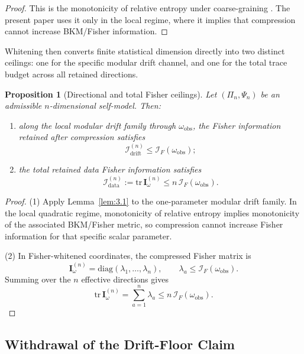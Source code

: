 \documentclass[12pt]{article}
\newtheorem{proposition}[theorem]{Proposition}
\theoremstyle{definition}
\theoremstyle{remark}
\begin{document}
\begin{proof}
This is the monotonicity of relative entropy under coarse-graining
\cite{Petz1986}. The present paper uses it only in the local regime,
where it implies that compression cannot increase BKM/Fisher
information.
\end{proof}

Whitening then converts finite statistical dimension directly into two
distinct ceilings: one for the specific modular drift channel, and one
for the total trace budget across all retained directions.

\begin{proposition}[Directional and total Fisher ceilings]\label{prop:3.2}
Let \((\Pi_n,\Psi_n)\) be an admissible \(n\)-dimensional self-model.
Then:
\begin{enumerate}
\item along the local modular drift family through
\(\omega_{\mathrm{obs}}\), the Fisher information retained after
compression satisfies
\[
\mathcal{I}^{(n)}_{\mathrm{drift}}
\le
\mathcal{I}_F(\omega_{\mathrm{obs}});
\]
\item the total retained data Fisher information satisfies
\[
\mathcal{I}^{(n)}_{\mathrm{data}}
:=
\mathrm{tr}\,\mathbf{I}^{(n)}_\omega
\le
n\,\mathcal{I}_F(\omega_{\mathrm{obs}}).
\]
\end{enumerate}
\end{proposition}

\begin{proof}
\(\!\)(1) Apply Lemma~\ref{lem:3.1} to the one-parameter modular drift
family. In the local quadratic regime, monotonicity of relative entropy
implies monotonicity of the associated BKM/Fisher metric, so
compression cannot increase Fisher information for that specific scalar
parameter.

\(\!\)(2) In Fisher-whitened coordinates, the compressed Fisher matrix is
\[
\mathbf{I}^{(n)}_\omega
=
\mathrm{diag}(\lambda_1,\dots,\lambda_n),
\qquad
\lambda_a \le \mathcal{I}_F(\omega_{\mathrm{obs}}).
\]
Summing over the \(n\) effective directions gives
\[
\mathrm{tr}\,\mathbf{I}^{(n)}_\omega
=
\sum_{a=1}^n \lambda_a
\le
n\,\mathcal{I}_F(\omega_{\mathrm{obs}}).
\]
\end{proof}

\subsection{Withdrawal of the Drift-Floor Claim}\label{subsec:3.2}
\end{document}
